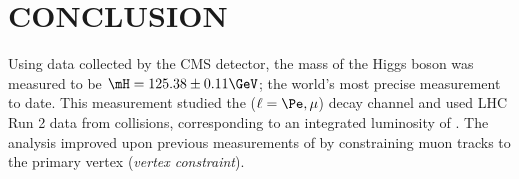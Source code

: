 \chapter{CONCLUSION}
\label{ch:conclusion}
Using data collected by the CMS detector, the mass of the Higgs boson was measured to be $\mH = 125.38 \pm 0.11\GeV$;
the world's most precise measurement to date.
This measurement studied the \hzzfourl ($\ell = \Pe, \mu$) decay channel and used LHC Run 2 data from \pp collisions, corresponding to an integrated luminosity of \lumiruntwo.
The analysis improved upon previous measurements of \mH by constraining muon tracks to the primary vertex (\emph{vertex constraint}).